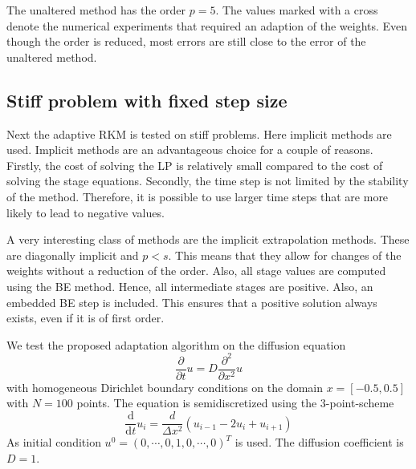 \documentclass[a4paper]{article}
\numberwithin{equation}{section}
\theoremstyle{plain}
\theoremstyle{definition}
\numberwithin{theorem}{section}
\newcommand{\1}{\mathbbm{1}}
\begin{document}
The unaltered method has the order $p=5$. 
The values marked with a cross denote the numerical experiments that required an adaption of the weights. 
Even though the order is reduced, most errors are still close to the error of the unaltered method.

\subsection{Stiff problem with fixed step size}
Next the adaptive RKM is tested on stiff problems. Here implicit methods are used.
Implicit methods are an advantageous choice for a couple of reasons. 
Firstly, the cost of solving the LP is relatively small compared to the cost of solving the stage equations.
Secondly, the time step is not limited by the stability of the method.
Therefore, it is possible to use larger time steps that are more likely to lead to negative values.

A very interesting class of methods are the implicit extrapolation methods. These are diagonally implicit and $p < s$. This means that they allow for changes of the weights without a reduction of the order.
Also, all stage values are computed using the BE method. Hence, all intermediate stages are positive.
Also, an embedded BE step is included. This ensures that a positive solution always exists, even if it is of first order.

We test the proposed adaptation algorithm on the diffusion equation
\begin{equation}
\frac{\partial }{\partial t} u = D \frac{\partial^2}{\partial x^2} u
\end{equation}
with homogeneous Dirichlet boundary conditions on the domain $x = [-0.5,0.5]$ with $N=100$ points. The equation is semidiscretized using the 3-point-scheme
\begin{equation}
\frac{\mathrm d}{\mathrm d t} u_i = \frac{d}{\Delta x^2} \left( u_{i-1} - 2u_i + u_{i+1} \right)
\end{equation}
As initial condition $u^0 = (0,\cdots,0,1,0,\cdots,0)^T$ is used. The diffusion coefficient is $D=1$.
\end{document}
